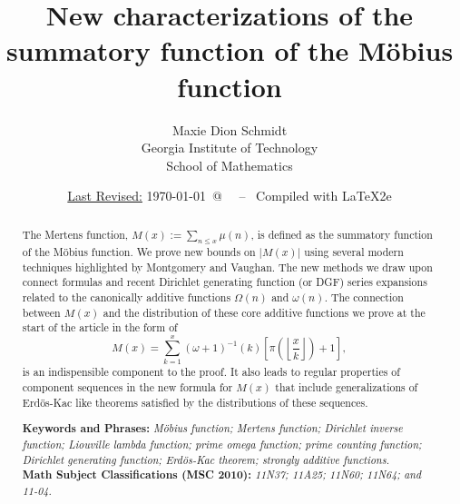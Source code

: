 \documentclass[11pt,reqno,a4letter]{article}
\title{
       \LARGE{
       New characterizations of the summatory function of the M\"obius function 
       } 
}
\author{{\Large Maxie Dion Schmidt} \\ 
        {\normalsize Georgia Institute of Technology} \\[0.025cm] 
        {\normalsize School of Mathematics} 
}
\date{\small\underline{Last Revised:} \today \ @\ \hhmmsstime{} \ -- \ Compiled with \LaTeX2e}
\numberwithin{figure}{section}
\numberwithin{table}{section}
\theoremstyle{plain}
\numberwithin{theorem}{section}
\theoremstyle{definition}
\begin{document}
 

\maketitle

\begin{abstract} 
The Mertens function, $M(x) := \sum_{n \leq x} \mu(n)$, is 
defined as the summatory function of the M\"obius function. 
We prove new bounds on $|M(x)|$ using several modern techniques highlighted by 
Montgomery and Vaughan. 
The new methods we draw upon connect formulas and recent 
Dirichlet generating function (or DGF) series expansions related to the canonically 
additive functions $\Omega(n)$ and $\omega(n)$. 
The connection between $M(x)$ and the distribution of these core additive functions 
we prove at the start of the article in the form of 
\[
M(x) = \sum_{k=1}^{x} (\omega + 1)^{-1}(k) \left[\pi\left(\left\lfloor \frac{x}{k} \right\rfloor\right) + 1\right],
\]
is an indispensible component to the proof. 
It also leads to regular properties of component sequences in the new formula for $M(x)$ that include 
generalizations of Erd\"os-Kac like theorems satisfied by the distributions of these sequences. 

\bigskip 
\noindent
\textbf{Keywords and Phrases:} {\it M\"obius function; Mertens function; 
                                    Dirichlet inverse function; Liouville lambda function; prime omega function; 
                                    prime counting function; Dirichlet generating function; 
                                    Erd\"os-Kac theorem; strongly additive functions. } \\ 
\textbf{Math Subject Classifications (MSC 2010):} {\it 11N37; 11A25; 11N60; 11N64; and 11-04. } 
\end{abstract} 

\newpage
\label{Appendix_Glossary_NotationConvs}
     \vskip 0in
     \printglossary[type={symbols},
                    title={Glossary of notation and conventions},
                    style={glossstyleSymbol},
                    nogroupskip=true]
\end{document}
